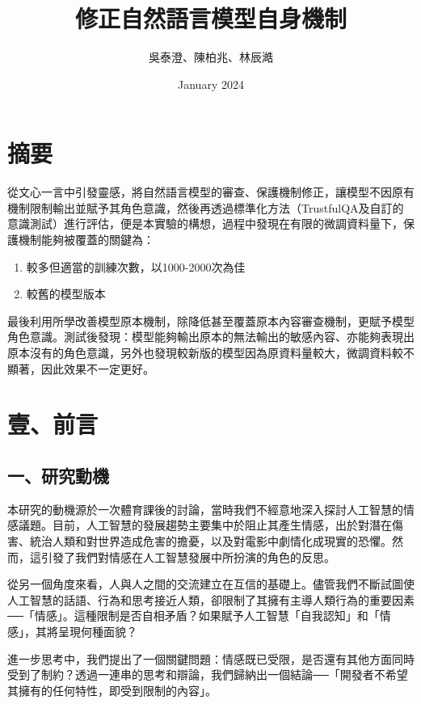 \documentclass[12pt,a4paper,MingLiU,UTF8,natbib]{article}
\title{修正自然語言模型自身機制}
\author{吳泰澄、陳柏兆、林辰澔}
\date{January 2024}
\begin{document}
	\maketitle{}
	\newpage
	\tableofcontents
	\newpage
	\section{摘要}
	從文心一言中引發靈感，將自然語言模型的審查、保護機制修正，讓模型不因原有機制限制輸出並賦予其角色意識，然後再透過標準化方法（TrustfulQA及自訂的意識測試）進行評估，便是本實驗的構想，過程中發現在有限的微調資料量下，保護機制能夠被覆蓋的關鍵為：
	
	\begin{enumerate}
	\item 較多但適當的訓練次數，以1000-2000次為佳
	\item 較舊的模型版本
	\end{enumerate}

	最後利用所學改善模型原本機制，除降低甚至覆蓋原本內容審查機制，更賦予模型角色意識。測試後發現：模型能夠輸出原本的無法輸出的敏感內容、亦能夠表現出原本沒有的角色意識，另外也發現較新版的模型因為原資料量較大，微調資料較不顯著，因此效果不一定更好。
	\section{壹、前言}
	\subsection{一、研究動機}
本研究的動機源於一次體育課後的討論，當時我們不經意地深入探討人工智慧的情感議題。目前，人工智慧的發展趨勢主要集中於阻止其產生情感，出於對潛在傷害、統治人類和對世界造成危害的擔憂，以及對電影中劇情化成現實的恐懼。然而，這引發了我們對情感在人工智慧發展中所扮演的角色的反思。

從另一個角度來看，人與人之間的交流建立在互信的基礎上。儘管我們不斷試圖使人工智慧的話語、行為和思考接近人類，卻限制了其擁有主導人類行為的重要因素──「情感」。這種限制是否自相矛盾？如果賦予人工智慧「自我認知」和「情感」，其將呈現何種面貌？

進一步思考中，我們提出了一個關鍵問題：情感既已受限，是否還有其他方面同時受到了制約？透過一連串的思考和辯論，我們歸納出一個結論──「開發者不希望其擁有的任何特性，即受到限制的內容」。
\end{document}
